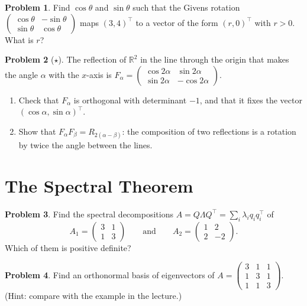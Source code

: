 \documentclass[11pt]{article}
\theoremstyle{definition}
\newtheorem{problem}{Problem}[section]
\begin{document}
\begin{problem}\label{pr:givens}
    Find $\cos\theta$ and $\sin\theta$ such that the Givens rotation $\begin{pmatrix} \cos\theta & -\sin\theta \\ \sin\theta & \cos\theta \end{pmatrix}$ maps $(3, 4)^\top$ to a vector of the form $(r, 0)^\top$ with $r > 0$. What is $r$?
\end{problem}

\begin{problem}[$\star$]\label{pr:reflections}
    The reflection of $\mathbb{R}^2$ in the line through the origin that makes the angle $\alpha$ with the $x$-axis is $F_\alpha = \begin{pmatrix} \cos 2\alpha & \sin 2\alpha \\ \sin 2\alpha & -\cos 2\alpha \end{pmatrix}$.
    \begin{enumerate}[label=(\alph*)]
        \item Check that $F_\alpha$ is orthogonal with determinant $-1$, and that it fixes the vector $(\cos\alpha, \sin\alpha)^\top$.
        \item Show that $F_\alpha F_\beta = R_{2(\alpha - \beta)}$: the composition of two reflections is a rotation by twice the angle between the lines.
    \end{enumerate}
\end{problem}

\section{The Spectral Theorem}

\begin{problem}\label{pr:spectral-2}
    Find the spectral decompositions $A = Q\Lambda Q^\top = \sum_i \lambda_i q_i q_i^\top$ of
    \[A_1 = \begin{pmatrix} 3 & 1 \\ 1 & 3 \end{pmatrix} \qquad \text{and} \qquad A_2 = \begin{pmatrix} 1 & 2 \\ 2 & -2 \end{pmatrix}.\]
    Which of them is positive definite?
\end{problem}

\begin{problem}\label{pr:spectral-3}
    Find an orthonormal basis of eigenvectors of $A = \begin{pmatrix} 3 & 1 & 1 \\ 1 & 3 & 1 \\ 1 & 1 & 3 \end{pmatrix}$. (Hint: compare with the example in the lecture.)
\end{problem}
\end{document}
